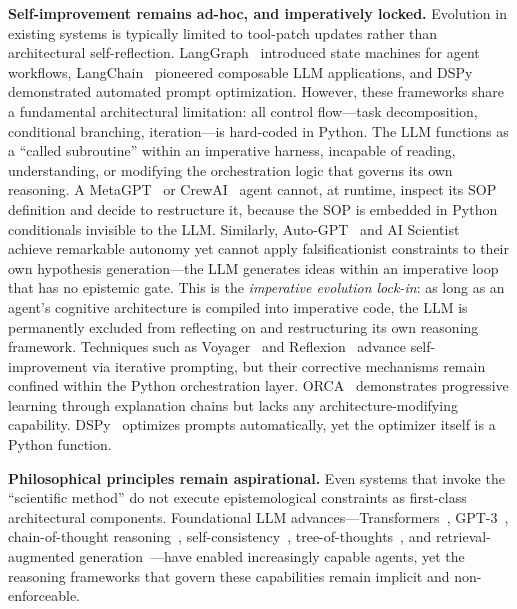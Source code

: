 \documentclass[review]{elsarticle}
\begin{document}
\textbf{Self-improvement remains ad-hoc, and imperatively locked.} Evolution in existing systems is typically limited to tool-patch updates rather than architectural self-reflection. LangGraph~\cite{langchain2024langgraph} introduced state machines for agent workflows, LangChain~\cite{chase2022langchain} pioneered composable LLM applications, and DSPy~\cite{khattab2023dspy} demonstrated automated prompt optimization. However, these frameworks share a fundamental architectural limitation: all control flow---task decomposition, conditional branching, iteration---is hard-coded in Python\@. The LLM functions as a ``called subroutine'' within an imperative harness, incapable of reading, understanding, or modifying the orchestration logic that governs its own reasoning. A MetaGPT~\cite{hong2023metagpt} or CrewAI~\cite{crewai2024crewai} agent cannot, at runtime, inspect its SOP definition and decide to restructure it, because the SOP is embedded in Python conditionals invisible to the LLM. Similarly, Auto-GPT~\cite{significantgravitas2023autogpt} and AI Scientist~\cite{sakana2025ai} achieve remarkable autonomy yet cannot apply falsificationist constraints to their own hypothesis generation---the LLM generates ideas within an imperative loop that has no epistemic gate. This is the \emph{imperative evolution lock-in}: as long as an agent's cognitive architecture is compiled into imperative code, the LLM is permanently excluded from reflecting on and restructuring its own reasoning framework. Techniques such as Voyager~\cite{wang2023voyager} and Reflexion~\cite{shinn2023reflexion} advance self-improvement via iterative prompting, but their corrective mechanisms remain confined within the Python orchestration layer. ORCA~\cite{mukherjee2023orca} demonstrates progressive learning through explanation chains but lacks any architecture-modifying capability. DSPy~\cite{khattab2023dspy} optimizes prompts automatically, yet the optimizer itself is a Python function.

\textbf{Philosophical principles remain aspirational.} Even systems that invoke the ``scientific method'' do not execute epistemological constraints as first-class architectural components. Foundational LLM advances---Transformers~\cite{vaswani2017attention}, GPT-3~\cite{brown2020language}, chain-of-thought reasoning~\cite{wei2022chain}, self-consistency~\cite{wang2023selfconsistency}, tree-of-thoughts~\cite{yao2023tree}, and retrieval-augmented generation~\cite{lewis2020retrieval}---have enabled increasingly capable agents, yet the reasoning frameworks that govern these capabilities remain implicit and non-enforceable.
\end{document}

